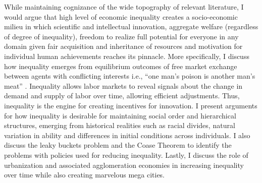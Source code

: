 \documentclass[12pt]{article}
\newcommand{\1}{\mathbbm 1}
\begin{document}
While maintaining cognizance of the wide topography of relevant literature, I would argue that high level of economic inequality creates a socio-economic milieu in which scientific and intellectual innovation, aggregate welfare (regardless of degree of inequality), freedom to realize full potential for everyone in any domain given fair acquisition and inheritance of resources and motivation for individual human achievements reaches its pinnacle. More specifically, I discuss how inequality emerges from equilibrium outcomes of free market exchange between agents with conflicting interests i.e., ``one man's poison is another man's meat'' \cite{friedman1976fragility}. Inequality allows labor markets to reveal signals about the change in demand and supply of labor over time, allowing efficient adjustments. Thus, inequality is the engine for creating incentives for innovation. I present arguments for how inequality is desirable for maintaining social order and hierarchical structures, emerging from historical realities such as racial divides, natural variation in ability and differences in initial conditions across individuals. I also discuss the leaky buckets problem and the Coase Theorem to identify the problems with policies used for reducing inequality.  Lastly, I discuss the role of urbanization and associated agglomeration economies in increasing inequality over time while also creating marvelous mega cities.








	
	
	
	
	

	
	
	
	
	
	 
\end{document}
